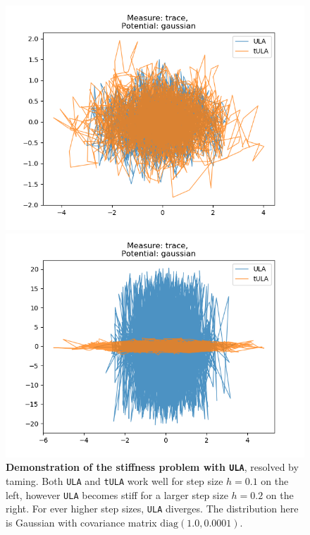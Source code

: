 \begin{figure}[H]
\centering
  \begin{minipage}[b]{0.49\textwidth}
  \centering
    \includegraphics[width=\textwidth]{Figures/ula_tula_step_01.png}
  \end{minipage} %
  \begin{minipage}[b]{0.49\textwidth}
  \centering
    \includegraphics[width=\textwidth]{Figures/ula_tula_step_02.png}
  \end{minipage}
   \caption{\textbf{Demonstration of the stiffness problem with \texttt{ULA}}, resolved by taming. Both \texttt{ULA} and \texttt{tULA} work well for step size $h = 0.1$ on the left, however \texttt{ULA} becomes stiff for a larger step size $h = 0.2$ on the right. For ever higher step sizes, \texttt{ULA} diverges. The distribution here is Gaussian with covariance matrix $\text{diag}(1.0, 0.0001)$.}
   \label{fig:stiffULA}
\end{figure}

